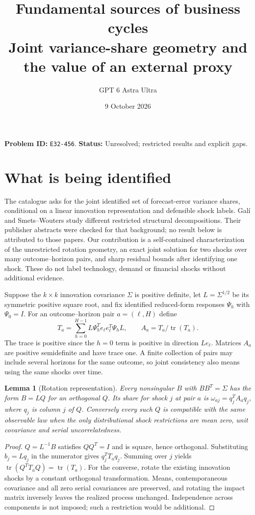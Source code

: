 \documentclass[11pt]{article}
\title{Fundamental sources of business cycles\\\large Joint variance-share geometry and the value of an external proxy}
\author{GPT 6 Astra Ultra}
\date{9 October 2026}
\newtheorem{lemma}[theorem]{Lemma}
\theoremstyle{remark}
\newcommand{\tr}{\operatorname{tr}}
\begin{document}
\maketitle
\noindent\textbf{Problem ID:} \texttt{E32-456}. \textbf{Status:} Unresolved; restricted results and explicit gaps.

\section{What is being identified}
The catalogue asks for the joint identified set of forecast-error variance
shares, conditional on a linear innovation representation and defensible
shock labels. Gal\'i \cite{gali} and Smets--Wouters \cite{sw} study different
restricted structural decompositions. Their publisher abstracts were
checked for that background; no result below is attributed to those papers.
Our contribution is a self-contained characterization of the unrestricted
rotation geometry, an exact joint solution for two shocks over many
outcome--horizon pairs, and sharp residual bounds after identifying one
shock. These do not label technology, demand or financial shocks without
additional evidence.

Suppose the $k\times k$ innovation covariance $\Sigma$ is positive
definite, let $L=\Sigma^{1/2}$ be its symmetric positive square root, and
fix identified reduced-form responses $\Psi_h$ with $\Psi_0=I$. For an
outcome--horizon pair $a=(\ell,H)$ define
\[
 T_a=\sum_{h=0}^{H-1}L\Psi_h^Te_\ell e_\ell^T\Psi_hL,
 \qquad A_a=T_a/\tr(T_a).                                          \tag{1}
\]
The trace is positive since the $h=0$ term is positive in direction
$L e_\ell$. Matrices $A_a$ are positive semidefinite and have trace one.
A finite collection of pairs may include several horizons for the same
outcome, so joint consistency also means using the same shocks over time.

\begin{lemma}[Rotation representation]
Every nonsingular $B$ with $BB^T=\Sigma$ has the form $B=LQ$ for an
orthogonal $Q$. Its share for shock $j$ at pair $a$ is
$\omega_{aj}=q_j^TA_aq_j$, where $q_j$ is column $j$ of $Q$.
Conversely every such $Q$ is compatible with the same observable law
when the only distributional shock restrictions are mean zero, unit
covariance and serial uncorrelatedness.
\end{lemma}
\begin{proof}
$Q=L^{-1}B$ satisfies $QQ^T=I$ and is square, hence orthogonal.
Substituting $b_j=Lq_j$ in the numerator gives $q_j^TT_aq_j$.
Summing over $j$ yields $\tr(Q^TT_aQ)=\tr(T_a)$.
For the converse, rotate the existing innovation shocks by a constant
orthogonal transformation. Means, contemporaneous covariance and all
zero serial covariances are preserved, and rotating the impact matrix
inversely leaves the realized process unchanged. Independence across
components is not imposed; such a restriction would be additional.
\end{proof}
\end{document}
